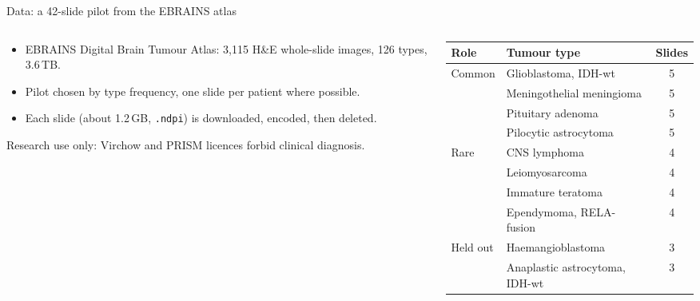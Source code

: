 \documentclass[aspectratio=169,11pt]{beamer}
\newcommand{\aside}[1]{{\color{muted}\small #1}}
\begin{document}
\begin{frame}{Data: a 42-slide pilot from the EBRAINS atlas}
  \begin{columns}[T]
    \begin{column}{0.42\textwidth}
      \begin{itemize}
        \item EBRAINS Digital Brain Tumour Atlas: 3{,}115 H\&E whole-slide images, 126 types, 3.6\,TB.
        \item Pilot chosen by type frequency, one slide per patient where possible.
        \item Each slide (about 1.2\,GB, \texttt{.ndpi}) is downloaded, encoded, then deleted.
      \end{itemize}
      \vspace{0.5em}
      \aside{Research use only: Virchow and PRISM licences forbid clinical diagnosis.}
    \end{column}
    \begin{column}{0.55\textwidth}
      \footnotesize
      \begin{tabular}{@{}llc@{}}
        \toprule
        Role & Tumour type & Slides\\
        \midrule
        Common & Glioblastoma, IDH-wt & 5\\
               & Meningothelial meningioma & 5\\
               & Pituitary adenoma & 5\\
               & Pilocytic astrocytoma & 5\\
        \midrule
        Rare & CNS lymphoma & 4\\
             & Leiomyosarcoma & 4\\
             & Immature teratoma & 4\\
             & Ependymoma, RELA-fusion & 4\\
        \midrule
        Held out & Haemangioblastoma & 3\\
                 & Anaplastic astrocytoma, IDH-wt & 3\\
        \bottomrule
      \end{tabular}
    \end{column}
  \end{columns}
\end{frame}
\end{document}
